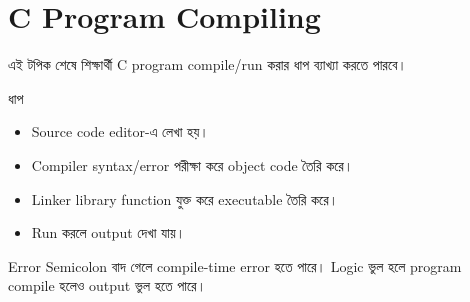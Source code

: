 \section{C Program Compiling}

\begin{learningbox}
এই টপিক শেষে শিক্ষার্থী C program compile/run করার ধাপ ব্যাখ্যা করতে পারবে।
\end{learningbox}

\begin{center}
\end{center}

\begin{keypointbox}{ধাপ}
\begin{itemize}
\item Source code editor-এ লেখা হয়।
\item Compiler syntax/error পরীক্ষা করে object code তৈরি করে।
\item Linker library function যুক্ত করে executable তৈরি করে।
\item Run করলে output দেখা যায়।
\end{itemize}
\end{keypointbox}

\begin{examplebox}{Error}
Semicolon বাদ গেলে compile-time error হতে পারে। Logic ভুল হলে program compile হলেও output ভুল হতে পারে।
\end{examplebox}
